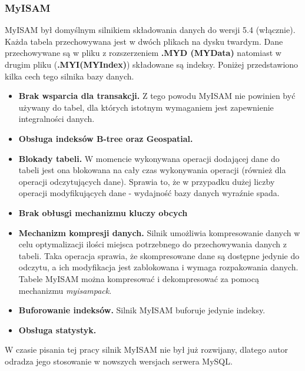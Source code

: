 \subsubsection{MyISAM}
MyISAM był domyślnym silnikiem składowania danych do wersji 5.4 (włącznie). Każda tabela przechowywana jest w dwóch plikach na dysku twardym. Dane przechowywane są w pliku z rozszerzeniem \textbf{.MYD (MYData)}
natomiast w drugim pliku (\textbf{.MYI(MYIndex)}) składowane są indeksy. Poniżej przedstawiono kilka cech tego silnika bazy danych. 
\begin{itemize}
	\item \textbf{Brak wsparcia dla transakcji.} Z tego powodu MyISAM nie powinien być używany do tabel, dla których istotnym wymaganiem jest zapewnienie integralności danych.
	\item \textbf{Obsługa indeksów B-tree oraz Geospatial.}
	\item \textbf{Blokady tabeli.}  W momencie wykonywana operacji dodającej dane do tabeli jest ona blokowana na cały czas wykonywania operacji (również dla operacji odczytujących dane). Sprawia to, że w przypadku dużej liczby operacji modyfikujących dane - wydajność bazy danych wyraźnie spada.
	\item \textbf{Brak obłusgi mechanizmu kluczy obcych}
	\item \textbf{Mechanizm kompresji danych.} Silnik umożliwia kompresowanie danych w celu optymalizacji ilości miejsca potrzebnego do przechowywania danych z tabeli. Taka operacja sprawia, że skompresowane dane są dostępne jedynie do odczytu, a ich modyfikacja jest zablokowana i wymaga rozpakowania danych. Tabele MyISAM można kompresować i dekompresować za pomocą mechanizmu \textit{myisampack}.
	\item \textbf{Buforowanie indeksów.} Silnik MyISAM buforuje jedynie indeksy.
	\item \textbf{Obsługa statystyk.}
\end{itemize}

W czasie pisania tej pracy silnik MyISAM nie był już rozwijany, dlatego autor odradza jego stosowanie w nowszych wersjach serwera MySQL. 

